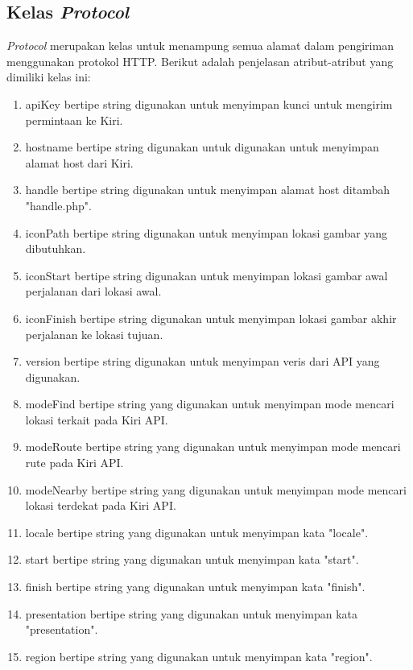 \subsection{Kelas \textit{Protocol}}
\label{lab:Kelas Protocol}
\hspace{0.5cm} \textit{Protocol} merupakan kelas untuk menampung semua alamat dalam pengiriman menggunakan protokol HTTP. Berikut adalah penjelasan atribut-atribut yang dimiliki kelas ini:
\begin{enumerate}
	\item apiKey bertipe string digunakan untuk menyimpan kunci untuk mengirim permintaan ke Kiri.
	\item hostname bertipe string digunakan untuk digunakan untuk menyimpan alamat host dari Kiri.
	\item handle bertipe string digunakan untuk menyimpan alamat host ditambah "handle.php".
	\item iconPath bertipe string digunakan untuk menyimpan lokasi gambar yang dibutuhkan.
	\item iconStart bertipe string digunakan untuk menyimpan lokasi gambar awal perjalanan dari lokasi awal.
	\item iconFinish bertipe string digunakan untuk menyimpan lokasi gambar akhir perjalanan ke lokasi tujuan.
	
	\item version bertipe string digunakan untuk menyimpan veris dari API yang digunakan.
	
	\item modeFind bertipe string yang digunakan untuk menyimpan mode mencari lokasi terkait pada Kiri API.
	\item modeRoute bertipe string yang digunakan untuk menyimpan mode mencari rute pada Kiri API.
	\item modeNearby bertipe string yang digunakan untuk menyimpan mode mencari lokasi terdekat pada Kiri API.
	
	\item locale bertipe string yang digunakan untuk menyimpan kata "locale".
	
	\item start bertipe string yang digunakan untuk menyimpan kata "start".
	\item finish bertipe string yang digunakan untuk menyimpan kata "finish".
	
	\item presentation bertipe string yang digunakan untuk menyimpan kata "presentation".
	
	\item region bertipe string yang digunakan untuk menyimpan kata "region".
\end{enumerate}

